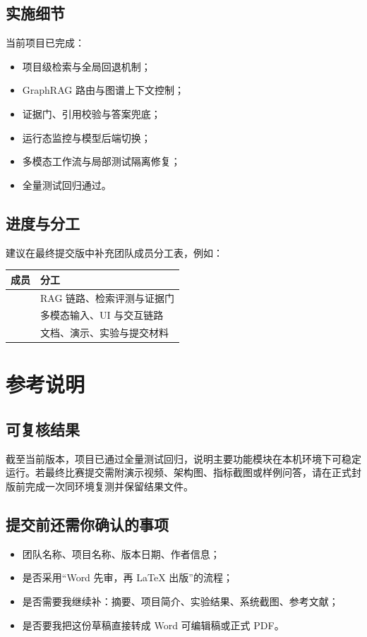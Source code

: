 \documentclass[UTF8,12pt]{ctexart}
\begin{document}
\subsection{实施细节}
当前项目已完成：
\begin{itemize}
  \item 项目级检索与全局回退机制；
  \item GraphRAG 路由与图谱上下文控制；
  \item 证据门、引用校验与答案兜底；
  \item 运行态监控与模型后端切换；
  \item 多模态工作流与局部测试隔离修复；
  \item 全量测试回归通过。
\end{itemize}

\subsection{进度与分工}
建议在最终提交版中补充团队成员分工表，例如：
\begin{longtable}{p{}p{}}
\toprule
成员 & 分工 \\
\midrule
[成员1] & RAG 链路、检索评测与证据门 \\
[成员2] & 多模态输入、UI 与交互链路 \\
[成员3] & 文档、演示、实验与提交材料 \\
\bottomrule
\end{longtable}

\section{参考说明}

\subsection{可复核结果}
截至当前版本，项目已通过全量测试回归，说明主要功能模块在本机环境下可稳定运行。若最终比赛提交需附演示视频、架构图、指标截图或样例问答，请在正式封版前完成一次同环境复测并保留结果文件。

\subsection{提交前还需你确认的事项}
\begin{itemize}
  \item 团队名称、项目名称、版本日期、作者信息；
  \item 是否采用“Word 先审，再 LaTeX 出版”的流程；
  \item 是否需要我继续补：摘要、项目简介、实验结果、系统截图、参考文献；
  \item 是否要我把这份草稿直接转成 Word 可编辑稿或正式 PDF。
\end{itemize}
\end{document}
